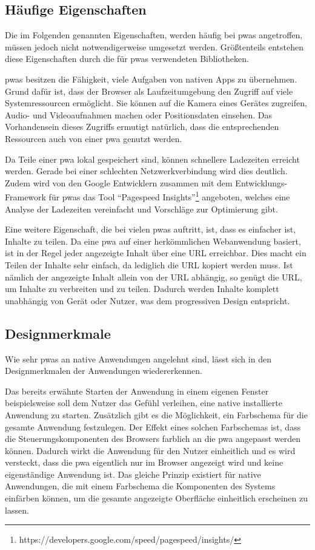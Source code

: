 \documentclass[12pt, parskip=half]{scrartcl}       %
\begin{document}
\subsection{Häufige Eigenschaften}

Die im Folgenden genannten Eigenschaften, werden häufig bei \acp{pwa} angetroffen, müssen jedoch nicht notwendigerweise umgesetzt werden.
Größtenteils entstehen diese Eigenschaften durch die für \acp{pwa} verwendeten Bibliotheken.

\acp{pwa} besitzen die Fähigkeit, viele Aufgaben von nativen Apps zu übernehmen.
Grund dafür ist, dass der Browser als Laufzeitumgebung den Zugriff auf viele Systemressourcen ermöglicht.
Sie können auf die Kamera eines Gerätes zugreifen, Audio- und Videoaufnahmen machen oder Positionsdaten einsehen.
Das Vorhandensein dieses Zugriffs ermutigt natürlich, dass die entsprechenden Ressourcen auch von einer \ac{pwa} genutzt werden.

Da Teile einer \ac{pwa} lokal gespeichert sind, können schnellere Ladezeiten erreicht werden.
Gerade bei einer schlechten Netzwerkverbindung wird dies deutlich.
Zudem wird von den Google Entwicklern zusammen mit dem Entwicklungs-Framework für \acp{pwa} das Tool \enquote{Pagespeed Insights}\footnote{https://developers.google.com/speed/pagespeed/insights/} angeboten, welches eine Analyse der Ladezeiten vereinfacht und Vorschläge zur Optimierung gibt.

Eine weitere Eigenschaft, die bei vielen \acp{pwa} auftritt, ist, dass es einfacher ist, Inhalte zu teilen.
Da eine \ac{pwa} auf einer herkömmlichen Webanwendung basiert, ist in der Regel jeder angezeigte Inhalt über eine URL erreichbar.
Dies macht ein Teilen der Inhalte sehr einfach, da lediglich die URL kopiert werden muss.
Ist nämlich der angezeigte Inhalt allein von der URL abhängig, so genügt die URL, um Inhalte zu verbreiten und zu teilen.
Dadurch werden Inhalte komplett unabhängig von Gerät oder Nutzer, was dem progressiven Design entspricht.


\subsection{Designmerkmale}

Wie sehr \acp{pwa} an native Anwendungen angelehnt sind, lässt sich in den Designmerkmalen der Anwendungen wiedererkennen.

Das bereits erwähnte Starten der Anwendung in einem eigenen Fenster beispielsweise soll dem Nutzer das Gefühl verleihen, eine native installierte Anwendung zu starten.
Zusätzlich gibt es die Möglichkeit, ein Farbschema für die gesamte Anwendung festzulegen.
Der Effekt eines solchen Farbschemas ist, dass die Steuerungskomponenten des Browsers farblich an die \ac{pwa} angepasst werden können.
Dadurch wirkt die Anwendung für den Nutzer einheitlich und es wird versteckt, dass die \ac{pwa} eigentlich nur im Browser angezeigt wird und keine eigenständige Anwendung ist.
Das gleiche Prinzip existiert für native Anwendungen, die mit einem Farbschema die Komponenten des Systems einfärben können, um die gesamte angezeigte Oberfläche einheitlich erscheinen zu lassen.
\end{document}
